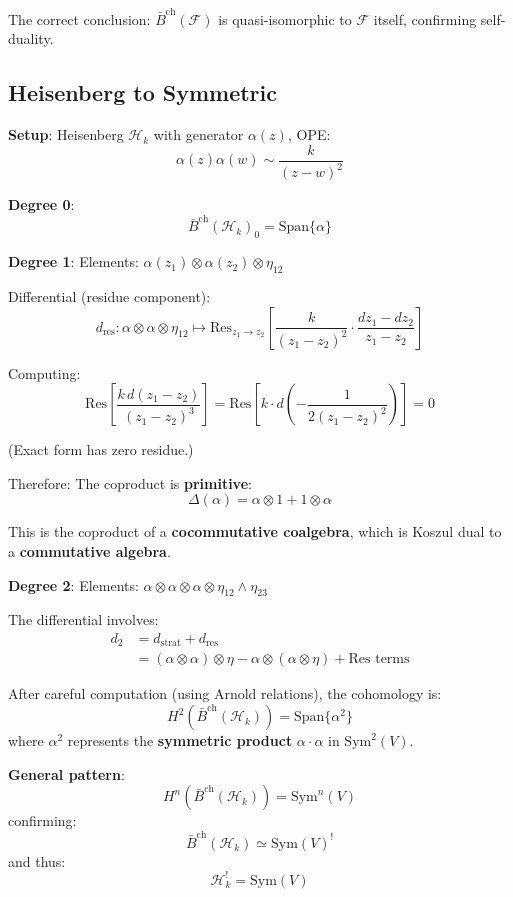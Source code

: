 The correct conclusion: $\bar{B}^{\text{ch}}(\mathcal{F})$ is quasi-isomorphic to 
$\mathcal{F}$ itself, confirming self-duality.

\subsection{Heisenberg to Symmetric}

\textbf{Setup}: Heisenberg $\mathcal{H}_k$ with generator $\alpha(z)$, OPE:
$$\alpha(z)\alpha(w) \sim \frac{k}{(z-w)^2}$$

\textbf{Degree 0}:
$$\bar{B}^{\text{ch}}(\mathcal{H}_k)_0 = \text{Span}\{\alpha\}$$

\textbf{Degree 1}:
Elements: $\alpha(z_1) \otimes \alpha(z_2) \otimes \eta_{12}$

Differential (residue component):
$$d_{\text{res}}: \alpha \otimes \alpha \otimes \eta_{12} \mapsto 
   \text{Res}_{z_1 \to z_2}\left[\frac{k}{(z_1-z_2)^2} \cdot \frac{dz_1-dz_2}{z_1-z_2}\right]$$

Computing:
$$\text{Res}\left[\frac{k \, d(z_1-z_2)}{(z_1-z_2)^3}\right] = 
   \text{Res}\left[k \cdot d\left(-\frac{1}{2(z_1-z_2)^2}\right)\right] = 0$$

(Exact form has zero residue.)

Therefore: The coproduct is \textbf{primitive}:
$$\Delta(\alpha) = \alpha \otimes 1 + 1 \otimes \alpha$$

This is the coproduct of a \textbf{cocommutative coalgebra}, which is Koszul dual to a 
\textbf{commutative algebra}.

\textbf{Degree 2}:
Elements: $\alpha \otimes \alpha \otimes \alpha \otimes \eta_{12} \wedge \eta_{23}$

The differential involves:
\begin{align*}
d_2 &= d_{\text{strat}} + d_{\text{res}} \\
&= (\alpha \otimes \alpha) \otimes \eta - \alpha \otimes (\alpha \otimes \eta) + 
    \text{Res terms}
\end{align*}

After careful computation (using Arnold relations), the cohomology is:
$$H^2(\bar{B}^{\text{ch}}(\mathcal{H}_k)) = \text{Span}\{\alpha^2\}$$
where $\alpha^2$ represents the \textbf{symmetric product} $\alpha \cdot \alpha$ in 
$\text{Sym}^2(V)$.

\textbf{General pattern}: 
$$H^n(\bar{B}^{\text{ch}}(\mathcal{H}_k)) = \text{Sym}^n(V)$$
confirming:
$$\bar{B}^{\text{ch}}(\mathcal{H}_k) \simeq \text{Sym}(V)^!$$
and thus:
$$\mathcal{H}_k^! = \text{Sym}(V)$$

